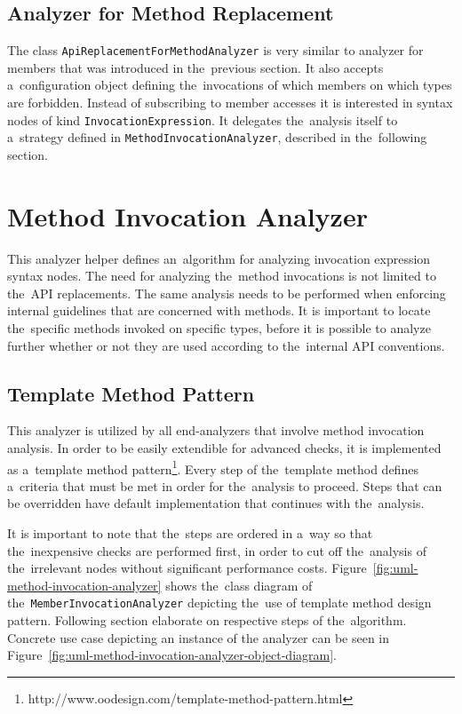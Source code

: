 \documentclass[
  digital, %
  table,   %
  lof,     %
  lot,     %
  oneside,
]{fithesis3}
\begin{document}
\subsection{Analyzer for Method Replacement}
The class \texttt{ApiReplacementForMethodAnalyzer} is very similar to analyzer for members that was introduced in the~previous section. It also accepts a~configuration object defining the~invocations of which members on which types are forbidden. 
Instead of subscribing to member accesses it is interested in syntax nodes of kind \texttt{InvocationExpression}. It delegates the~analysis itself to a~strategy defined in \texttt{MethodInvocationAnalyzer}, described in the~following section.

\section{Method Invocation Analyzer}
This analyzer helper defines an~algorithm for analyzing invocation expression syntax nodes. The need for analyzing the~method invocations is not limited to the~API replacements. The same analysis needs to be performed when enforcing internal guidelines that are concerned with methods. It is important to locate the~specific methods invoked on specific types, before it is possible to analyze further whether or not they are used according to the~internal API conventions. 

\subsection{Template Method Pattern}
This analyzer is utilized by all end-analyzers that involve method invocation analysis. In order to be easily extendible for advanced checks, it is implemented as a~template method pattern\footnote{http://www.oodesign.com/template-method-pattern.html}. Every step of the~template method defines a~criteria that must be met in order for the~analysis to proceed. Steps that can be overridden have default implementation that continues with the~analysis. 

It is important to note that the~steps are ordered in a~way so that the~inexpensive checks are performed first, in order to cut off the~analysis of the~irrelevant nodes without significant performance costs. Figure~\ref{fig:uml-method-invocation-analyzer} shows the~class diagram of the~\texttt{MemberInvocationAnalyzer} depicting the~use of template method design pattern. Following section elaborate on respective steps of the~algorithm. Concrete use case depicting an instance of the analyzer can be seen in Figure~\ref{fig:uml-method-invocation-analyzer-object-diagram}.  
\end{document}
